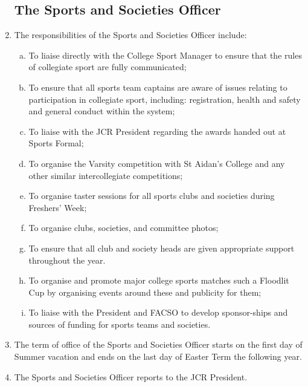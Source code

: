 \documentclass[12pt]{article}
\begin{document}
\begin{enumerate}
    \subsection{The Sports and Societies Officer}
    \item The responsibilities of the Sports and Societies Officer include:
    \begin{enumerate}[(a)]
        \item To liaise directly with the College Sport Manager to ensure that the rules of collegiate sport are fully communicated;
        \item To ensure that all sports team captains are aware of issues relating to participation in collegiate sport, including: registration, health and safety and general conduct within the system;
        \item To liaise with the JCR President regarding the awards handed out at Sports Formal;
        \item To organise the Varsity competition with St Aidan's College and any other similar intercollegiate competitions;
        \item To organise taster sessions for all sports clubs and societies during Freshers' Week;
        \item To organise clubs, societies, and committee photos;
        \item To ensure that all club and society heads are given appropriate support throughout the year.
        \item To organise and promote major college sports matches such a Floodlit Cup by organising events around these and publicity for them;
        \item To liaise with the President and FACSO to develop sponsor-ships and sources of funding for sports teams and societies. 
    \end{enumerate}
    \item The term of office of the Sports and Societies Officer starts on the first day of Summer vacation and ends on the last day of Easter Term the following year.
    \item The Sports and Societies Officer reports to the JCR President.

\end{enumerate}
\end{document}
